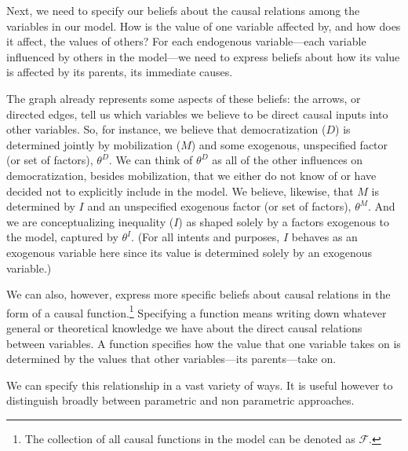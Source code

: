 \documentclass[
  12pt,
]{book}
\begin{document}
Next, we need to specify our beliefs about the causal relations among the variables in our model. How is the value of one variable affected by, and how does it affect, the values of others? For each endogenous variable---each variable influenced by others in the model---we need to express beliefs about how its value is affected by its parents, its immediate causes.

The graph already represents some aspects of these beliefs: the arrows, or directed edges, tell us which variables we believe to be direct causal inputs into other variables. So, for instance, we believe that democratization (\(D\)) is determined jointly by mobilization (\(M\)) and some exogenous, unspecified factor (or set of factors), \(\theta^D\). We can think of \(\theta^D\) as all of the other influences on democratization, besides mobilization, that we either do not know of or have decided not to explicitly include in the model. We believe, likewise, that \(M\) is determined by \(I\) and an unspecified exogenous factor (or set of factors), \(\theta^M\). And we are conceptualizing inequality (\(I\)) as shaped solely by a factors exogenous to the model, captured by \(\theta^I\). (For all intents and purposes, \(I\) behaves as an exogenous variable here since its value is determined solely by an exogenous variable.)

We can also, however, express more specific beliefs about causal relations in the form of a causal function.\footnote{The collection of all causal functions in the model can be denoted as \(\mathcal{F}\).} Specifying a function means writing down whatever general or theoretical knowledge we have about the direct causal relations between variables. A function specifies how the value that one variable takes on is determined by the values that other variables---its parents---take on.

We can specify this relationship in a vast variety of ways. It is useful however to distinguish broadly between parametric and non parametric approaches.
\end{document}
